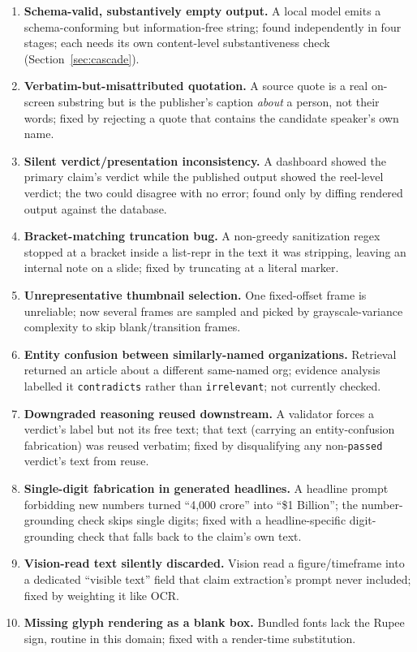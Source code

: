 \documentclass[conference]{IEEEtran}
\begin{document}
\begin{enumerate}
\item \textbf{Schema-valid, substantively empty output.} A local model emits a schema-conforming but information-free string; found independently in four stages; each needs its own content-level substantiveness check (Section~\ref{sec:cascade}).
\item \textbf{Verbatim-but-misattributed quotation.} A source quote is a real on-screen substring but is the publisher's caption \emph{about} a person, not their words; fixed by rejecting a quote that contains the candidate speaker's own name.
\item \textbf{Silent verdict/presentation inconsistency.} A dashboard showed the primary claim's verdict while the published output showed the reel-level verdict; the two could disagree with no error; found only by diffing rendered output against the database.
\item \textbf{Bracket-matching truncation bug.} A non-greedy sanitization regex stopped at a bracket inside a list-repr in the text it was stripping, leaving an internal note on a slide; fixed by truncating at a literal marker.
\item \textbf{Unrepresentative thumbnail selection.} One fixed-offset frame is unreliable; now several frames are sampled and picked by grayscale-variance complexity to skip blank/transition frames.
\item \textbf{Entity confusion between similarly-named organizations.} Retrieval returned an article about a different same-named org; evidence analysis labelled it \texttt{contradicts} rather than \texttt{irrelevant}; not currently checked.
\item \textbf{Downgraded reasoning reused downstream.} A validator forces a verdict's label but not its free text; that text (carrying an entity-confusion fabrication) was reused verbatim; fixed by disqualifying any non-\texttt{passed} verdict's text from reuse.
\item \textbf{Single-digit fabrication in generated headlines.} A headline prompt forbidding new numbers turned ``4,000 crore'' into ``\$1 Billion''; the number-grounding check skips single digits; fixed with a headline-specific digit-grounding check that falls back to the claim's own text.
\item \textbf{Vision-read text silently discarded.} Vision read a figure/timeframe into a dedicated ``visible text'' field that claim extraction's prompt never included; fixed by weighting it like OCR.
\item \textbf{Missing glyph rendering as a blank box.} Bundled fonts lack the Rupee sign, routine in this domain; fixed with a render-time substitution.

\end{enumerate}
\end{document}
